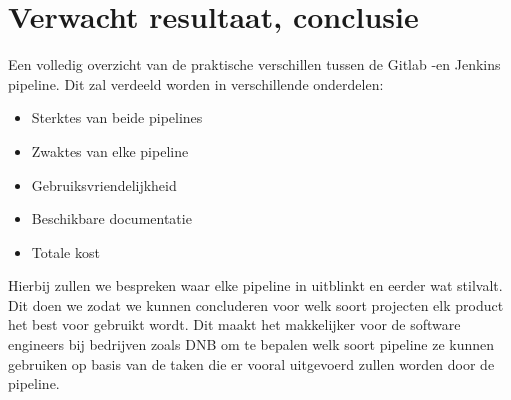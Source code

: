 \section{Verwacht resultaat, conclusie}%
\label{sec:verwachte_resultaten}
Een volledig overzicht van de praktische verschillen tussen de Gitlab -en Jenkins pipeline. Dit zal verdeeld worden in verschillende onderdelen:

\begin{itemize}
    \item Sterktes van beide pipelines
    \item Zwaktes van elke pipeline
    \item Gebruiksvriendelijkheid
    \item Beschikbare documentatie
    \item Totale kost
\end{itemize}

Hierbij zullen we bespreken waar elke pipeline in uitblinkt en eerder wat stilvalt. Dit doen we zodat we kunnen concluderen voor welk soort projecten elk product het best voor gebruikt wordt. Dit maakt het makkelijker voor de software engineers bij bedrijven zoals DNB om te bepalen welk soort pipeline ze kunnen gebruiken op basis van de taken die er vooral uitgevoerd zullen worden door de pipeline. 

